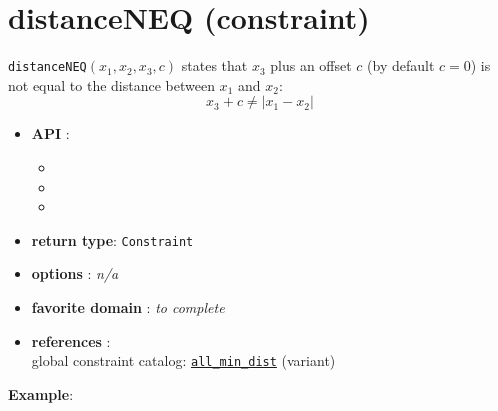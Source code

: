 \label{distanceneq}
\hypertarget{distanceneq}{}

\section{distanceNEQ (constraint)}\label{distanceneq:distanceneqconstraint}\hypertarget{distanceneq:distanceneqconstraint}{}
\begin{notedef}
  \texttt{distanceNEQ}$(x_1,x_2,x_3,c)$ states that $x_3$ plus an offset $c$ (by default $c=0$) is not equal to the distance between $x_1$ and $x_2$:
$$ x_3 + c \neq | x_1 - x_2 |$$
\end{notedef}

\begin{itemize}
	\item \textbf{API} :
	\begin{itemize}
		\item {}
		\item {}
		\item {}
	\end{itemize}
	\item \textbf{return type}: \texttt{Constraint}
	\item \textbf{options} : \emph{n/a}
	\item \textbf{favorite domain} : \emph{to complete}
	\item \textbf{references} :\\
      global constraint catalog: \href{http://www.emn.fr/x-info/sdemasse/gccat/Call_min_dist.html}{\tt all\_min\_dist} (variant)
\end{itemize}

\textbf{Example}:


